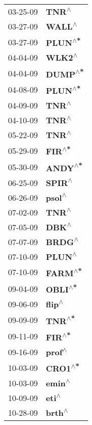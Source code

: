 \begin{supertabular}{p{0.08\textwidth}p{0.2\textwidth}}
 03-25-09 &     \textbf{TNR\textsuperscript{$\wedge$}} \\
 03-27-09 &    \textbf{WALL\textsuperscript{$\wedge$}} \\
 03-27-09 &   \textbf{PLUN\textsuperscript{$\wedge$*}} \\
 04-04-09 &    \textbf{WLK2\textsuperscript{$\wedge$}} \\
 04-04-09 &   \textbf{DUMP\textsuperscript{$\wedge$*}} \\
 04-08-09 &   \textbf{PLUN\textsuperscript{$\wedge$*}} \\
 04-09-09 &     \textbf{TNR\textsuperscript{$\wedge$}} \\
 04-10-09 &     \textbf{TNR\textsuperscript{$\wedge$}} \\
 05-22-09 &     \textbf{TNR\textsuperscript{$\wedge$}} \\
 05-29-09 &    \textbf{FIR\textsuperscript{$\wedge$*}} \\
 05-30-09 &   \textbf{ANDY\textsuperscript{$\wedge$*}} \\
 06-25-09 &    \textbf{SPIR\textsuperscript{$\wedge$}} \\
 06-26-09 &    \textbf{psol\textsuperscript{$\wedge$}} \\
 07-02-09 &     \textbf{TNR\textsuperscript{$\wedge$}} \\
 07-05-09 &     \textbf{DBK\textsuperscript{$\wedge$}} \\
 07-07-09 &    \textbf{BRDG\textsuperscript{$\wedge$}} \\
 07-10-09 &    \textbf{PLUN\textsuperscript{$\wedge$}} \\
 07-10-09 &   \textbf{FARM\textsuperscript{$\wedge$*}} \\
 09-04-09 &   \textbf{OBLI\textsuperscript{$\wedge$*}} \\
 09-06-09 &    \textbf{flip\textsuperscript{$\wedge$}} \\
 09-09-09 &    \textbf{TNR\textsuperscript{$\wedge$*}} \\
 09-11-09 &    \textbf{FIR\textsuperscript{$\wedge$*}} \\
 09-16-09 &    \textbf{prof\textsuperscript{$\wedge$}} \\
 10-03-09 &   \textbf{CRO1\textsuperscript{$\wedge$*}} \\
 10-03-09 &    \textbf{emin\textsuperscript{$\wedge$}} \\
 10-09-09 &     \textbf{eti\textsuperscript{$\wedge$}} \\
 10-28-09 &    \textbf{brth\textsuperscript{$\wedge$}} \\

\end{supertabular}

